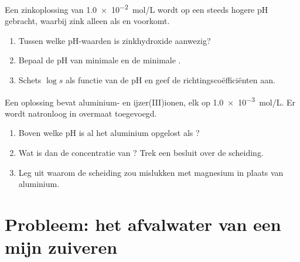 \begin{exercise}[$\star\star\star$]\label{exo:b1:precipitation:11}
Een zinkoplossing van \qty{1.0e-2}{mol/L} wordt op een steeds hogere pH
gebracht, waarbij zink alleen als  en  voorkomt.
\begin{enumerate}
  \item Tussen welke pH-waarden is zinkhydroxide aanwezig?
  \item Bepaal de pH van minimale  en de minimale
        .
  \item Schets $\log s$ als functie van de pH en geef de
        richtingscoëfficiënten aan.
\end{enumerate}
\end{exercise}

\begin{exercise}[$\star\star\star$]\label{exo:b1:precipitation:12}
Een oplossing bevat aluminium- en ijzer(III)ionen, elk op
\qty{1.0e-3}{mol/L}. Er wordt natronloog in overmaat toegevoegd.
\begin{enumerate}
  \item Boven welke pH is al het aluminium opgelost als ?
  \item Wat is dan de concentratie van ? Trek een besluit over
        de scheiding.
  \item Leg uit waarom de scheiding zou mislukken met magnesium in plaats
        van aluminium.
\end{enumerate}
\end{exercise}

\section{Probleem: het afvalwater van een mijn zuiveren}


